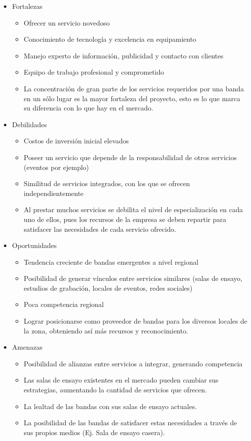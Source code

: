 \begin{itemize}
\begin{itemize}
\item Fortalezas
	\begin{itemize}
		\item Ofrecer un servicio novedoso
		\item Conocimiento de tecnología y excelencia en equipamiento
		\item Manejo experto de información, publicidad y contacto con clientes
		\item Equipo de trabajo profesional y comprometido
		\item La concentración de gran parte de los servicios requeridos por una banda en un sólo lugar es la mayor fortaleza del proyecto, esto es lo que marca su diferencia con lo que hay en el mercado.
	\end{itemize}
\item Debilidades
	\begin{itemize}
		\item Costos de inversión inicial elevados
		\item Poseer un servicio que depende de la responsabilidad de otros servicios (eventos por ejemplo)
		\item Similitud de servicios integrados, con los que se ofrecen independientemente
		\item Al prestar muchos servicios se debilita el nivel de especialización en cada uno de ellos, pues los recursos de la empresa se deben repartir para satisfacer las necesidades de cada servicio ofrecido.
	\end{itemize}
\item Oportunidades
	\begin{itemize}
		\item Tendencia creciente de bandas emergentes a nivel regional
		\item Posibilidad de generar vínculos entre servicios similares (salas de ensayo, estudios de grabación, locales de eventos, redes sociales)
		\item Poca competencia regional
		\item Lograr posicionarse como proveedor de bandas para los diversos locales de la zona, obteniendo así más recursos y reconocimiento.	
	\end{itemize}
\item Amenazas
	\begin{itemize}
		\item Posibilidad de alianzas entre servicios a integrar, generando competencia
		\item Las salas de ensayo existentes en el mercado pueden cambiar sus estrategias, aumentando la cantidad de servicios que ofrecen. 
		\item La lealtad de las bandas con sus salas de ensayo actuales.
		\item La posibilidad de las bandas de satisfacer estas necesidades a través de sus propios medios (Ej. Sala de ensayo casera).
	\end{itemize}
\end{itemize}



\end{itemize}
